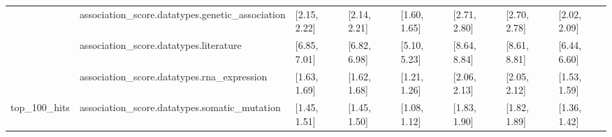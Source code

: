 \begin{table}[H]
{\begin{tabular}{llllllll}
 & association\_score.datatypes.genetic\_association & [2.15, 2.22] & [2.14, 2.21] & [1.60, 1.65] & [2.71, 2.80] & [2.70, 2.78] & [2.02, 2.09]\\

 & association\_score.datatypes.literature & [6.85, 7.01] & [6.82, 6.98] & [5.10, 5.23] & [8.64, 8.84] & [8.61, 8.81] & [6.44, 6.60]\\

 & association\_score.datatypes.rna\_expression & [1.63, 1.69] & [1.62, 1.68] & [1.21, 1.26] & [2.06, 2.13] & [2.05, 2.12] & [1.53, 1.59]\\

\multirow{-6}{*}{\raggedright\arraybackslash top\_100\_hits} & association\_score.datatypes.somatic\_mutation & [1.45, 1.51] & [1.45, 1.50] & [1.08, 1.12] & [1.83, 1.90] & [1.82, 1.89] & [1.36, 1.42]\\
\bottomrule
\end{tabular}}
\end{table}

